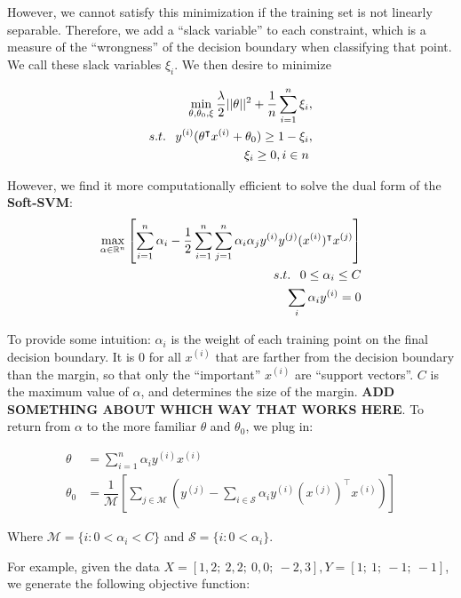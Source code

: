 \documentclass[10pt,letterpaper]{article}
\begin{document}
However, we cannot satisfy this minimization if the training set is not linearly separable. Therefore, we add a ``slack variable'' to each constraint, which is a measure of the ``wrongness'' of the decision boundary when classifying that point. We call these slack variables $\xi_i$. We then desire to minimize

\begin{align}
\min_{\theta, \theta_0, \xi} \dfrac{\lambda}{2} ||\theta||^2 + \dfrac{1}{n} \sum_{i=1}^{n} \xi_{i} &, \\
s.t. \hspace{.75em} y^{(i)}(\theta^\intercal x^{(i)} + \theta_0) \ge 1 - \xi_i &, \\
\xi_i \ge 0, i \in n &
\end{align}

However, we find it more computationally efficient to solve the dual form of the \textbf{Soft-SVM}:
\begin{align}
\max_{\alpha \in \mathbb{R}^n} \left[ \sum_{i=1}^n \alpha_i - \dfrac{1}{2} \sum_{i=1}^n \sum_{j=1}^n \alpha_i \alpha_j y^{(i)} y^{(j)} (x^{(i)})^\intercal x^{(j)}\right] & \\
s.t. \hspace{.75em} 0 \le \alpha_i \le C & \\
\sum_i \alpha_i y^{(i)} = 0 &
\end{align}

To provide some intuition: $\alpha_i$ is the weight of each training point on the final decision boundary. It is 0 for all $x^{(i)}$ that are farther from the decision boundary than the margin, so that only the ``important'' $x^{(i)}$ are ``support vectors''. $C$ is the maximum value of $\alpha$, and determines the size of the margin. \textbf{ADD SOMETHING ABOUT WHICH WAY THAT WORKS HERE}. To return from $\alpha$ to the more familiar $\theta$ and $\theta_0$, we plug in:

\begin{align}
\theta &= \sum_{i=1}^n \alpha_i y^{(i)} x^{(i)} \\
\theta_0 &= \dfrac{1}{\mathcal{M}} \left[ \sum_{j \in \mathcal{M}} \left( y^{(j)} - \sum_{i \in \mathcal{S}} \alpha_i y^{(i)} (x^{(j)})^\intercal x^{(i)} \right) \right]
\end{align}

Where $\mathcal{M} = \{ i : 0 < \alpha_i < C \}$ and $\mathcal{S} = \{ i : 0 < \alpha_i \}$.

For example, given the data $X = [1, 2;\ 2, 2;\ 0, 0;\ -2, 3], Y = [1;\ 1;\ -1;\ -1]$, we generate the following objective function:
\end{document}
